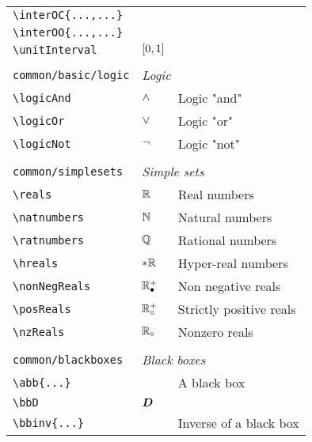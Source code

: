 \begin{longtable}{lll}
 {\color[rgb]{0.5,0.5,0.5}\texttt{\textbackslash interOC\{...,...\}}} &  & \\ 
 {\color[rgb]{0.5,0.5,0.5}\texttt{\textbackslash interOO\{...,...\}}} &  & \\ 
 {\color[rgb]{0.5,0.5,0.5}\texttt{\textbackslash unitInterval}} & $[0,1]$ & \\ 
  &  & \\ 
 {\color[rgb]{0.5,0.5,0.5}\texttt{common/basic/logic}} & \multicolumn{2}{l}{\emph{Logic}}\\ 
 \hline
{\color[rgb]{0.5,0.5,0.5}\texttt{\textbackslash logicAnd}} & $\wedge$ &  Logic "and"\\ 
 {\color[rgb]{0.5,0.5,0.5}\texttt{\textbackslash logicOr}} & $\vee$ &  Logic "or"\\ 
 {\color[rgb]{0.5,0.5,0.5}\texttt{\textbackslash logicNot}} & $\neg$ &  Logic "not"\\ 
  &  & \\ 
 {\color[rgb]{0.5,0.5,0.5}\texttt{common/simplesets}} & \multicolumn{2}{l}{\emph{Simple sets}}\\ 
 \hline
{\color[rgb]{0.5,0.5,0.5}\texttt{\textbackslash reals}} & $\mathbb{R}$ &  Real numbers\\ 
 {\color[rgb]{0.5,0.5,0.5}\texttt{\textbackslash natnumbers}} & $\mathbb{N}$ &  Natural numbers\\ 
 {\color[rgb]{0.5,0.5,0.5}\texttt{\textbackslash ratnumbers}} & $\mathbb{Q}$ &  Rational numbers\\ 
 {\color[rgb]{0.5,0.5,0.5}\texttt{\textbackslash hreals}} & $\ast\mathbb{R}$ &  Hyper-real numbers\\ 
 {\color[rgb]{0.5,0.5,0.5}\texttt{\textbackslash nonNegReals}} & $\mathbb{R}^{+}_{\bullet}$ &  Non negative reals \\ 
 {\color[rgb]{0.5,0.5,0.5}\texttt{\textbackslash posReals}} & $\mathbb{R}^{+}_{\circ}$ &  Strictly positive reals\\ 
 {\color[rgb]{0.5,0.5,0.5}\texttt{\textbackslash nzReals}} & $\mathbb{R}_{\circ}$ &  Nonzero reals\\ 
  &  & \\ 
 {\color[rgb]{0.5,0.5,0.5}\texttt{common/blackboxes}} & \multicolumn{2}{l}{\emph{Black boxes}}\\ 
 \hline
{\color[rgb]{0.5,0.5,0.5}\texttt{\textbackslash abb\{...\}}} &  &  A black box\\ 
 {\color[rgb]{0.5,0.5,0.5}\texttt{\textbackslash bbD}} & $\boldsymbol{D}$ & \\ 
 {\color[rgb]{0.5,0.5,0.5}\texttt{\textbackslash bbinv\{...\}}} &  &  Inverse of a black box\\ 

\end{longtable}
